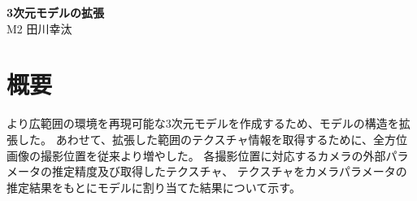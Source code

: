 \documentclass[]{jarticle}          %
\begin{document}

\vspace*{2ex}
\begin{center}
 {\Large \bf 3次元モデルの拡張}\\ %
 \vspace*{5mm}
 {\large M2 田川幸汰}%
\end{center}






\section{概要}
より広範囲の環境を再現可能な3次元モデルを作成するため、モデルの構造を拡張した。
あわせて、拡張した範囲のテクスチャ情報を取得するために、全方位画像の撮影位置を従来より増やした。
各撮影位置に対応するカメラの外部パラメータの推定精度及び取得したテクスチャ、
テクスチャをカメラパラメータの推定結果をもとにモデルに割り当てた結果について示す。
  
\end{document}
